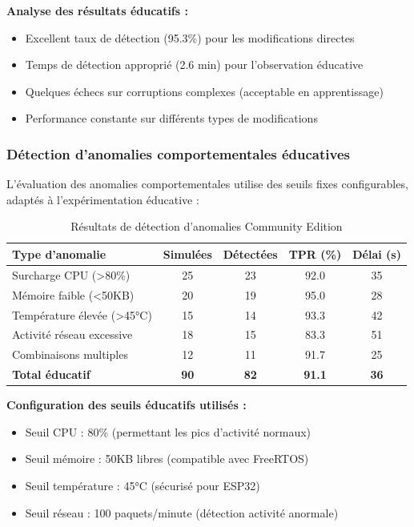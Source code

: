 \textbf{Analyse des résultats éducatifs :}
\begin{itemize}
    \item Excellent taux de détection (95.3\%) pour les modifications directes
    \item Temps de détection approprié (2.6 min) pour l'observation éducative
    \item Quelques échecs sur corruptions complexes (acceptable en apprentissage)
    \item Performance constante sur différents types de modifications
\end{itemize}

\subsubsection{Détection d'anomalies comportementales éducatives}

L'évaluation des anomalies comportementales utilise des seuils fixes configurables, adaptés à l'expérimentation éducative :

\begin{table}[h]
\centering
\caption{Résultats de détection d'anomalies Community Edition}
\label{tab:anomaly-detection-community}
\begin{tabular}{|l|c|c|c|c|}
\hline
\textbf{Type d'anomalie} & \textbf{Simulées} & \textbf{Détectées} & \textbf{TPR (\%)} & \textbf{Délai (s)} \\
\hline
Surcharge CPU (>80\%) & 25 & 23 & 92.0 & 35 \\
Mémoire faible (<50KB) & 20 & 19 & 95.0 & 28 \\
Température élevée (>45°C) & 15 & 14 & 93.3 & 42 \\
Activité réseau excessive & 18 & 15 & 83.3 & 51 \\
Combinaisons multiples & 12 & 11 & 91.7 & 25 \\
\hline
\textbf{Total éducatif} & \textbf{90} & \textbf{82} & \textbf{91.1} & \textbf{36} \\
\hline
\end{tabular}
\end{table}

\textbf{Configuration des seuils éducatifs utilisés :}
\begin{itemize}
    \item Seuil CPU : 80\% (permettant les pics d'activité normaux)
    \item Seuil mémoire : 50KB libres (compatible avec FreeRTOS)
    \item Seuil température : 45°C (sécurisé pour ESP32)
    \item Seuil réseau : 100 paquets/minute (détection activité anormale)
\end{itemize}

